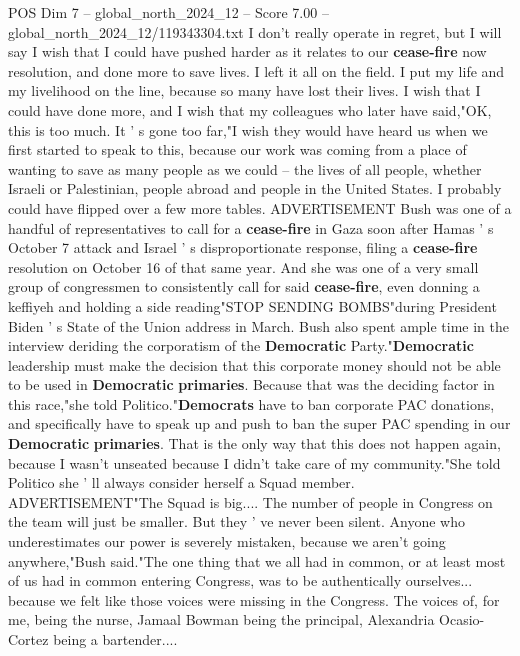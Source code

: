 \begin{textsample}{POS Dim 7 – global\_north\_2024\_12 – Score 7.00 – global\_north\_2024\_12/119343304.txt}  \label{ex:f7_pos_289}
I don't really operate in regret, but I will say I wish that I could have pushed harder as it relates to our \textbf{cease-fire} now resolution, and done more to save lives.
I left it all on the field.
I put my life and my livelihood on the line, because so many have lost their lives.
I wish that I could have done more, and I wish that my colleagues who later have said,"OK, this is too much.
It ' s gone too far,"I wish they would have heard us when we first started to speak to this, because our work was coming from a place of wanting to save as many people as we could -- the lives of all people, whether Israeli or Palestinian, people abroad and people in the United States.
I probably could have flipped over a few more tables.
ADVERTISEMENT Bush was one of a handful of representatives to call for a \textbf{cease-fire} in Gaza soon after Hamas ' s October 7 attack and Israel ' s disproportionate response, filing a \textbf{cease-fire} resolution on October 16 of that same year.
And she was one of a very small group of congressmen to consistently call for said \textbf{cease-fire}, even donning a keffiyeh and holding a side reading"STOP SENDING BOMBS"during President Biden ' s State of the Union address in March.
Bush also spent ample time in the interview deriding the corporatism of the \textbf{Democratic} Party."\textbf{Democratic} leadership must make the decision that this corporate money should not be able to be used in \textbf{Democratic} \textbf{primaries}.
Because that was the deciding factor in this race,"she told Politico."\textbf{Democrats} have to ban corporate PAC donations, and specifically have to speak up and push to ban the super PAC spending in our \textbf{Democratic} \textbf{primaries}.
That is the only way that this does not happen again, because I wasn't unseated because I didn't take care of my community."She told Politico she ' ll always consider herself a Squad member.
ADVERTISEMENT"The Squad is big....
The number of people in Congress on the team will just be smaller.
But they ' ve never been silent.
Anyone who underestimates our power is severely mistaken, because we aren't going anywhere,"Bush said."The one thing that we all had in common, or at least most of us had in common entering Congress, was to be authentically ourselves... because we felt like those voices were missing in the Congress.
The voices of, for me, being the nurse, Jamaal Bowman being the principal, Alexandria Ocasio-Cortez being a bartender....

\end{textsample}

